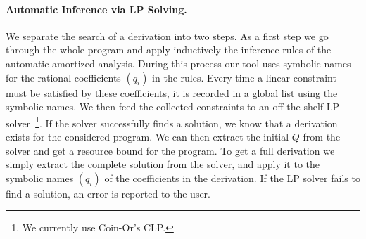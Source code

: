 \documentclass[nocopyrightspace,preprint]{sigplanconf}
\begin{document}
\paragraph{Automatic Inference via LP Solving.}

We separate the search of a derivation into two steps.  As a first
step we go through the whole program and apply inductively the
inference rules of the automatic amortized analysis.  During this
process our tool uses symbolic names for the rational coefficients
$(q_i)$ in the rules.  Every time a linear constraint must be
satisfied by these coefficients, it is recorded in a global list using
the symbolic names.  We then feed the collected constraints to an
off the shelf LP solver~\footnote{We currently use Coin-Or's CLP.}.
If the solver successfully finds a solution, we know that a derivation
exists for the considered program.  We can then extract the initial
$Q$ from the solver and get a resource bound for the program.  To get
a full derivation we simply extract the complete solution from the
solver, and apply it to the symbolic names $(q_i)$ of the coefficients
in the derivation.  If the LP solver fails to find a solution, an
error is reported to the user.
\end{document}
